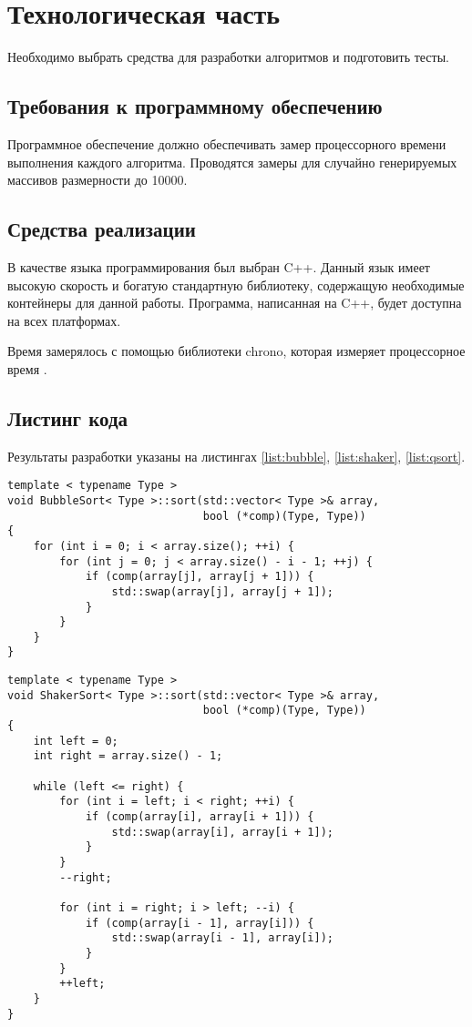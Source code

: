 \newpage
\section{Технологическая часть}

Необходимо выбрать средства для разработки алгоритмов и подготовить тесты.

\subsection{Требования к программному обеспечению}

Программное обеспечение должно обеспечивать замер процессорного времени выполнения каждого
алгоритма. Проводятся замеры для случайно генерируемых массивов размерности до 10000.

\subsection{Средства реализации}

В качестве языка программирования был выбран C++. Данный язык имеет высокую скорость и
богатую стандартную библиотеку, содержащую необходимые контейнеры для данной работы.
Программа, написанная на C++, будет доступна на всех платформах.

Время замерялось с помощью библиотеки chrono, которая измеряет процессорное
время \cite{chrono}.

\subsection{Листинг кода}

Результаты разработки указаны на листингах \ref{list:bubble}, \ref{list:shaker},
\ref{list:qsort}.

\begin{lstlisting}[caption=Сортировка пузырьком,label=list:bubble]
template < typename Type >
void BubbleSort< Type >::sort(std::vector< Type >& array,
                              bool (*comp)(Type, Type))
{
    for (int i = 0; i < array.size(); ++i) {
        for (int j = 0; j < array.size() - i - 1; ++j) {
            if (comp(array[j], array[j + 1])) {
                std::swap(array[j], array[j + 1]);
            }
        }
    }
}
\end{lstlisting}

\begin{lstlisting}[caption=Сортировка шейкером,label=list:shaker]
template < typename Type >
void ShakerSort< Type >::sort(std::vector< Type >& array,
                              bool (*comp)(Type, Type))
{
    int left = 0;
    int right = array.size() - 1;

    while (left <= right) {
        for (int i = left; i < right; ++i) {
            if (comp(array[i], array[i + 1])) {
                std::swap(array[i], array[i + 1]);
            }
        }
        --right;

        for (int i = right; i > left; --i) {
            if (comp(array[i - 1], array[i])) {
                std::swap(array[i - 1], array[i]);
            }
        }
        ++left;
    }
}
\end{lstlisting}

